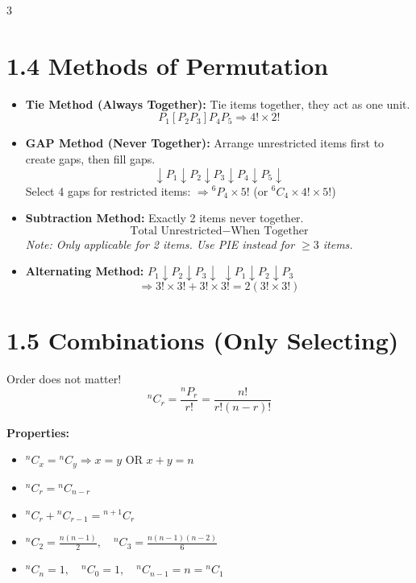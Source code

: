 \documentclass[11pt,a4paper,landscape]{article}
\begin{document}
\begin{multicols*}{3}
\section*{1.4 Methods of Permutation}
\begin{itemize}
\item \textbf{Tie Method (Always Together):} Tie items together, they act as one unit. 
  $$P_1 [P_2 P_3] P_4 P_5 \Rightarrow 4! \times 2!$$
\item \textbf{GAP Method (Never Together):} Arrange unrestricted items first to create gaps, then fill gaps.
  $$\downarrow P_1 \downarrow P_2 \downarrow P_3 \downarrow P_4 \downarrow P_5 \downarrow$$
  Select 4 gaps for restricted items: $\Rightarrow {}^6P_4 \times 5!$ \quad (or ${}^6C_4 \times 4! \times 5!$)
\item \textbf{Subtraction Method:} Exactly 2 items never together. 
  $$\text{Total Unrestricted} - \text{When Together}$$
  \textit{Note: Only applicable for 2 items. Use PIE instead for $\ge 3$ items.}
\item \textbf{Alternating Method:} 
  $P_1 \downarrow P_2 \downarrow P_3 \downarrow$  $\downarrow P_1 \downarrow P_2 \downarrow P_3$
  $$\Rightarrow 3! \times 3! + 3! \times 3! = 2(3! \times 3!)$$
\end{itemize}

\section*{1.5 Combinations (Only Selecting)}
Order does not matter!
$${}^nC_r = \frac{{}^nP_r}{r!} = \frac{n!}{r!(n-r)!}$$

\textbf{Properties:}
\begin{itemize}
\item ${}^nC_x = {}^nC_y \Rightarrow x=y \text{ OR } x+y=n$
\item ${}^nC_r = {}^nC_{n-r}$
\item ${}^nC_r + {}^nC_{r-1} = {}^{n+1}C_r$
\item ${}^nC_2 = \frac{n(n-1)}{2}, \quad {}^nC_3 = \frac{n(n-1)(n-2)}{6}$
\item ${}^nC_n = 1, \quad {}^nC_0 = 1, \quad {}^nC_{n-1} = n = {}^nC_1$
\end{itemize}


\end{multicols*}
\end{document}
